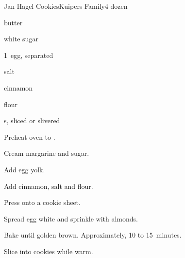 \begin{recipe}{Jan Hagel Cookies}{Kuipers Family}{4 dozen}

\begin{ingredients}
\item {} butter
\item {} white sugar
\item 1~egg, separated
\item \tp{\half} salt
\item \tp{\half} cinnamon
\item {} flour
\item {}s, sliced or slivered
\end{ingredients}

\begin{directions}
\item Preheat oven to .
\item Cream margarine and sugar.
\item Add egg yolk.
\item Add cinnamon, salt and flour.
\item Press onto a cookie sheet.
\item Spread egg white and sprinkle with almonds.
\item Bake until golden brown. Approximately, 10 to 15~minutes.
\item Slice into cookies while warm.
\end{directions}
\end{recipe}
